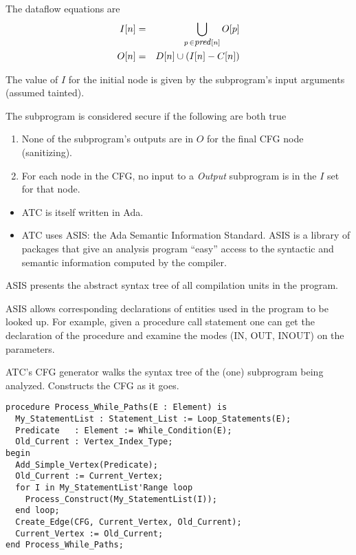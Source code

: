 \documentclass[landscape]{slides}
\begin{document}
The dataflow equations are
\begin{eqnarray*}
I[n] & = & \bigcup_{p\, \in \mbox{\textit{\small pred}}[n]} O[p] \\
O[n] & = & D[n] \cup (I[n] - C[n])
\end{eqnarray*}

The value of $I$ for the initial node is given by the subprogram's input arguments (assumed
tainted).

The subprogram is considered secure if the following are both true
\begin{enumerate}
\item None of the subprogram's outputs are in $O$ for the final CFG node (sanitizing).
\item For each node in the CFG, no input to a \textit{Output} subprogram is in the $I$ set for
that node.
\end{enumerate}

\stopslide

\begin{itemize}
\item ATC is itself written in Ada.
\item ATC uses ASIS: the Ada Semantic Information Standard. ASIS is a library of packages that
give an analysis program ``easy'' access to the syntactic and semantic information computed by
the compiler.
\end{itemize}
ASIS presents the abstract syntax tree of all compilation units in the program.

ASIS allows corresponding declarations of entities used in the program to be looked up. For
example, given a procedure call statement one can get the declaration of the procedure and
examine the modes (IN, OUT, INOUT) on the parameters.
\stopslide

ATC's CFG generator walks the syntax tree of the (one) subprogram being analyzed. Constructs the
CFG as it goes.
\begin{verbatim}
procedure Process_While_Paths(E : Element) is
  My_StatementList : Statement_List := Loop_Statements(E);
  Predicate   : Element := While_Condition(E);
  Old_Current : Vertex_Index_Type;
begin
  Add_Simple_Vertex(Predicate);
  Old_Current := Current_Vertex;
  for I in My_StatementList'Range loop
    Process_Construct(My_StatementList(I));
  end loop;
  Create_Edge(CFG, Current_Vertex, Old_Current);
  Current_Vertex := Old_Current;
end Process_While_Paths;
\end{verbatim}
\stopslide
\end{document}
